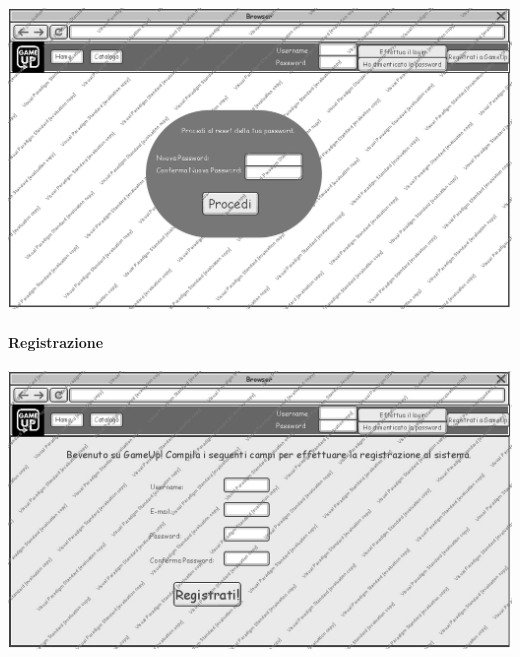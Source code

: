 \newpage
\begin{center}
\includegraphics[width=\textwidth,height=\textheight,keepaspectratio]{Figure/Mockups/RecuperoPassword2.jpg}
\end{center}

\newpage
\paragraph{Registrazione}
\begin{center}
\includegraphics[width=\textwidth,height=\textheight,keepaspectratio]{Figure/Mockups/Registrazione.jpg}
\end{center}

\newpage
